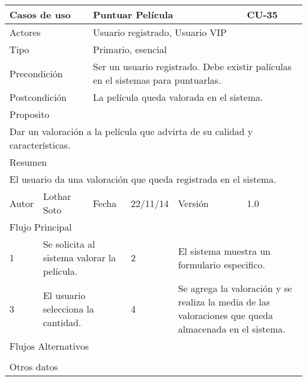 \documentclass{article}
\begin{document}
\begin{table}[h]
\begin{tabular}{|l|l|l|l|l|l|}
\hline
\multicolumn{2}{|p{2cm}|}{Casos de uso}  & \multicolumn{3}{p{7cm}|}{Puntuar Película} & CU-35 \\
\hline
\multicolumn{2}{|p{2cm}|}{Actores}       & \multicolumn{4}{p{8cm}|}{Usuario registrado, Usuario VIP}        \\
\hline
\multicolumn{2}{|p{2cm}|}{Tipo}          & \multicolumn{4}{p{8cm}|}{Primario, esencial}        \\
\hline
\multicolumn{2}{|p{2cm}|}{Precondición}  & \multicolumn{4}{p{8cm}|}{Ser un usuario registrado. Debe existir palículas en el sistemas para puntuarlas.}        \\
\hline
\multicolumn{2}{|p{2cm}|}{Postcondición} & \multicolumn{4}{p{8cm}|}{La película queda valorada en el sistema.}        \\
\hline
\multicolumn{6}{|p{10cm}|}{Proposito}                                   \\
\hline
\multicolumn{6}{|p{10cm}|}{Dar un valoración a la película que advirta de su calidad y características.}                                            \\
\hline
\multicolumn{6}{|p{10cm}|}{Resumen}                                 \\
\hline
\multicolumn{6}{|p{10cm}|}{El usuario da una valoración que queda registrada en el sistema.}                                            \\
\hline
Autor         &       Lothar Soto        &  Fecha   &  22/11/14   &   Versión  & 1.0\\
\hline
\multicolumn{6}{|p{10cm}|}{Flujo Principal}\\
\hline
\multicolumn{1}{|p{1cm}|}{1} & \multicolumn{2}{p{3cm}}{Se solicita al sistema valorar la película.} & \multicolumn{1}{|p{1cm}|}{2} & \multicolumn{2}{p{3cm}|}{El sistema muestra un formulario especifico.}\\
\hline
\multicolumn{1}{|p{1cm}|}{3} & \multicolumn{2}{p{3cm}}{El usuario selecciona la cantidad.} & \multicolumn{1}{|p{1cm}|}{4} & \multicolumn{2}{p{3cm}|}{Se agrega la valoración y se realiza la media de las valoraciones que queda almacenada en el sistema.}\\
\hline
\multicolumn{6}{|p{10cm}|}{Flujos Alternativos}\\
\hline
\multicolumn{1}{|p{1cm}}{} & \multicolumn{5}{|p{9cm}|}{}\\
\hline
\multicolumn{6}{|p{10cm}|}{Otros datos}\\

\end{tabular}
\end{table}
\end{document}
